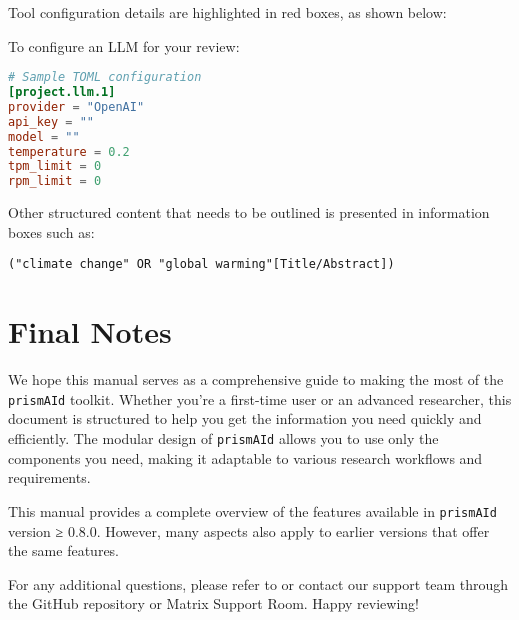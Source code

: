 Tool configuration details are highlighted in red boxes, as shown below:

\begin{configbox}
To configure an LLM for your review:
\begin{lstlisting}[language=TOML]
# Sample TOML configuration
[project.llm.1]
provider = "OpenAI"
api_key = ""
model = ""
temperature = 0.2
tpm_limit = 0
rpm_limit = 0
\end{lstlisting}
\end{configbox}

Other structured content that needs to be outlined is presented in information boxes such as:
\begin{infobox}
\begin{lstlisting}
("climate change" OR "global warming"[Title/Abstract])
\end{lstlisting}
\end{infobox}


\section*{Final Notes}

We hope this manual serves as a comprehensive guide to making the most of the \texttt{prismAId} toolkit. Whether you're a first-time user or an advanced researcher, this document is structured to help you get the information you need quickly and efficiently. The modular design of \texttt{prismAId} allows you to use only the components you need, making it adaptable to various research workflows and requirements.

This manual provides a complete overview of the features available in \texttt{prismAId} version ≥ 0.8.0. However, many aspects also apply to earlier versions that offer the same features.

For any additional questions, please refer to  or contact our support team through the GitHub repository or Matrix Support Room. Happy reviewing!
